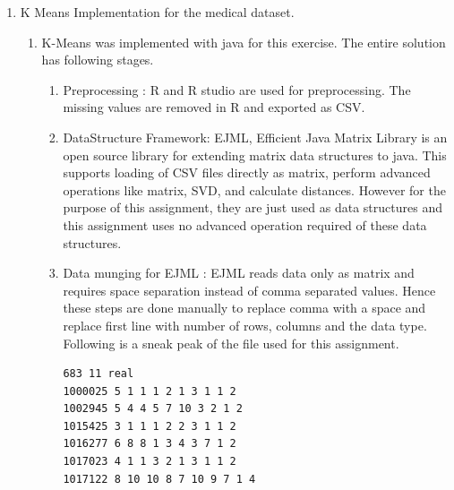 \documentclass{article}
\begin{document}
\begin{enumerate}
\begin{enumerate}
\begin{lstlisting}[language=R]
    }
  }
  print(output)
}
delkl<-delstar[,2:10]
col<-1:9
calculateKL(delkl,col,col)
\end{lstlisting}
The KL Distance Values are as follows,
\begin{verbatim}
     [,1] [,2] [,3] [,4] [,5] [,6] [,7] [,8] [,9]
 [1,] 0.00 0.35 0.33 0.46 0.26 0.48 0.30 0.48 0.43
 [2,] 0.33 0.00 0.09 0.30 0.23 0.34 0.24 0.32 0.53
 [3,] 0.31 0.09 0.00 0.32 0.24 0.33 0.25 0.33 0.53
 [4,] 0.45 0.28 0.30 0.00 0.33 0.38 0.32 0.44 0.56
 [5,] 0.28 0.24 0.24 0.35 0.00 0.43 0.23 0.36 0.35
 [6,] 0.44 0.30 0.29 0.39 0.40 0.00 0.34 0.50 0.68
 [7,] 0.30 0.25 0.25 0.31 0.21 0.38 0.00 0.36 0.45
 [8,] 0.45 0.27 0.28 0.43 0.34 0.47 0.33 0.00 0.59
 [9,] 0.49 0.48 0.50 0.55 0.35 0.68 0.48 0.54 0.00
\end{verbatim}
\end{enumerate}
\item K Means Implementation for the medical dataset.
\begin{enumerate}
\item K-Means was implemented with java for this exercise. The entire solution has following stages.
\begin{enumerate}
\item Preprocessing : R and R studio are used for preprocessing. The missing values are removed in R and exported as CSV.
\item DataStructure Framework: EJML, Efficient Java Matrix Library is an open source library for extending matrix data structures to java. This supports loading of CSV files directly as matrix, perform advanced operations like matrix, SVD, and calculate distances. However for the purpose of this assignment, they are just used as data structures and this assignment uses no advanced operation required of these data structures.
\item Data munging for EJML : EJML reads data only as matrix and requires space separation instead of comma separated values. Hence these steps are done manually to replace comma with a space and replace first line with number of rows, columns and the data type. Following is a sneak peak of the file used for this assignment.
\begin{verbatim}
683 11 real
1000025 5 1 1 1 2 1 3 1 1 2
1002945 5 4 4 5 7 10 3 2 1 2
1015425 3 1 1 1 2 2 3 1 1 2
1016277 6 8 8 1 3 4 3 7 1 2
1017023 4 1 1 3 2 1 3 1 1 2
1017122 8 10 10 8 7 10 9 7 1 4


\end{verbatim}
\end{enumerate}
\end{enumerate}
\end{enumerate}
\end{document}

